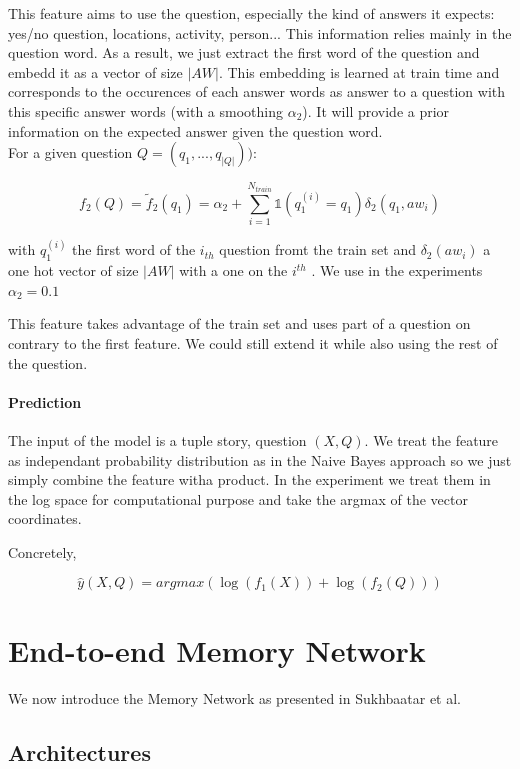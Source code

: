 \documentclass[twoside,11pt]{article}
\begin{document}
This feature aims to use the question, especially the kind of answers it expects: yes/no question, locations, activity, person... This information relies mainly in the question word. As a result, we just extract the first word of the question and embedd it as a vector of size $|AW|$. This embedding is learned at train time and corresponds to the occurences of each answer words as answer to a question with this specific answer words (with a smoothing $\alpha_2$). It will provide a prior information on the expected answer given the question word.\\

\noindent For a given question $Q = (q_1, ..., q_{|Q|}))$:

\[
f_2(Q) = \tilde{f}_2(q_1) = \alpha_2 + \sum_{i = 1}^{N_{train}} \mathbb{1}(q_1^{(i)}=q_1) \delta_2(q_1, aw_i)
\]

\noindent with $q_1^{(i)}$ the first word of the $i_{th}$ question fromt the train set and $\delta_2(aw_i)$ a one hot vector of size $|AW|$ with a one on the $i^{th}$ . We use in the experiments $\alpha_2 = 0.1$ 

\noindent This feature takes advantage of the train set and uses part of a question on contrary to the first feature. We could still extend it while also using the rest of the question. 

\paragraph{Prediction}

The input of the model is a tuple story, question $(X,Q)$. We treat the feature as independant probability distribution as in the Naive Bayes approach so we just simply combine the feature witha product. In the experiment we treat them in the log space for computational purpose and take the argmax of the vector coordinates.

Concretely,

\[
\hat{y}(X,Q) = argmax(\log(f_1(X)) + \log(f_2(Q)))
\]
\section{End-to-end Memory Network}

We now introduce the Memory Network as presented in Sukhbaatar et al.

\subsection{Architectures}
\end{document}
